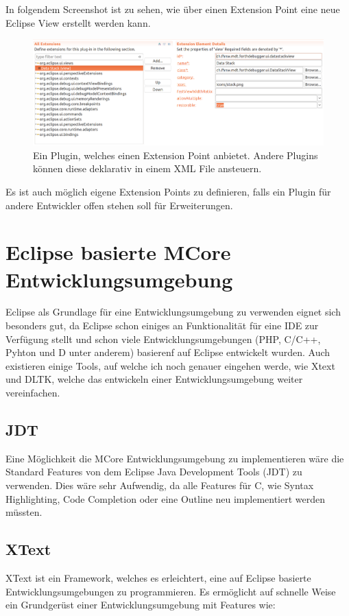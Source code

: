 \newpage
In folgendem Screenshot ist zu sehen, wie über einen Extension Point eine neue Eclipse View erstellt werden kann.
\begin{figure}[H]
	\centering
		\includegraphics[scale=0.25]{platform/extensionpoint2.png}
		\caption{Ein Plugin, welches einen Extension Point anbietet. Andere Plugins können diese deklarativ in einem XML File ansteuern.}
		\label{fig:extensionpoint}
\end{figure}

Es ist auch möglich eigene Extension Points zu definieren, falls ein Plugin für andere Entwickler offen stehen soll für Erweiterungen.

\section{Eclipse basierte MCore Entwicklungsumgebung}

Eclipse als Grundlage für eine Entwicklungsumgebung zu verwenden eignet sich besonders gut, da Eclipse schon einiges an Funktionalität für eine IDE zur Verfügung stellt und schon viele Entwicklungsumgebungen (PHP, C/C++, Pyhton und D unter anderem) basierenf auf Eclipse entwickelt wurden. Auch existieren einige Tools, auf welche ich noch genauer eingehen werde, wie Xtext und DLTK, welche das entwickeln einer Entwicklungsumgebung weiter vereinfachen.

\subsection{JDT}
Eine Möglichkeit die MCore Entwicklungsumgebung zu implementieren wäre die Standard Features von dem Eclipse Java Development Tools (JDT) zu verwenden. Dies wäre sehr Aufwendig, da alle Features für C, wie Syntax Highlighting, Code Completion oder eine Outline neu implementiert werden müssten.

\subsection{XText}
XText ist ein Framework, welches es erleichtert, eine auf Eclipse basierte Entwicklungsumgebungen zu programmieren. Es ermöglicht auf schnelle Weise ein Grundgerüst einer Entwicklungsumgebung mit Features wie:

